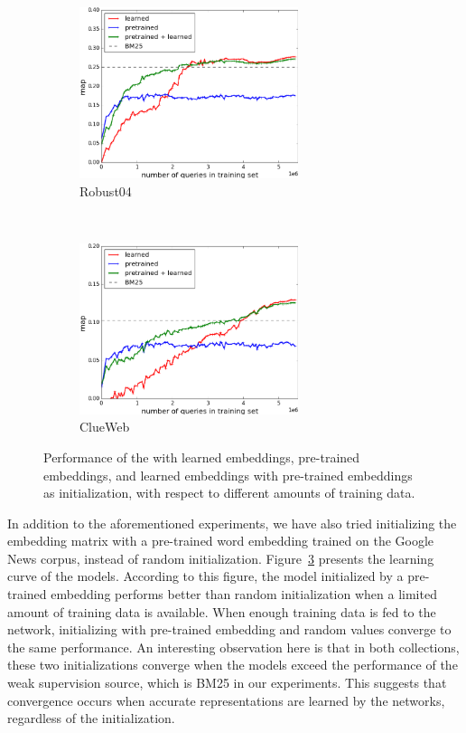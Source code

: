\begin{figure}[t]
    \centering
    \begin{subfigure}[t]{0.45\textwidth}
        \centering
        \includegraphics[height=5cm]{03-part-02/chapter-04/figs_and_tables/plot_with_pretrained_emb_robust.png}
        \caption{\label{fig:embedding_r}Robust04}
    \end{subfigure}%
    ~
    \begin{subfigure}[t]{0.45\textwidth}
        \centering
        \includegraphics[height=5cm]{03-part-02/chapter-04/figs_and_tables/plot_with_pretrained_emb_clueweb.png}
        \caption{\label{fig:embedding_c}ClueWeb}
    \end{subfigure}%
    \caption{\label{fig:embedding}Performance of the \modelthree with learned embeddings, pre-trained embeddings, and learned embeddings with pre-trained embeddings as initialization, with respect to different amounts of training data.}
\end{figure}

In addition to the aforementioned experiments, we have also tried initializing the embedding matrix with a pre-trained word embedding trained on the Google News corpus, instead of random initialization.
%
Figure~\ref{fig:embedding} presents the learning curve of the models. According to this figure, the model initialized by a pre-trained embedding performs better than random initialization when a limited amount of training data is available. 
%
When enough training data is fed to the network, initializing with pre-trained embedding and random values converge to the same performance.
An interesting observation here is that in both collections, these two initializations converge when the models exceed the performance of the weak supervision source, which is BM25 in our experiments. 
This suggests that convergence occurs when accurate representations are learned by the networks, regardless of the initialization.

